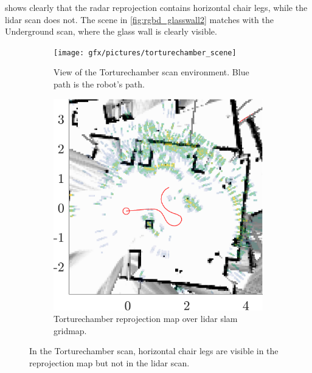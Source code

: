  shows clearly that the radar reprojection contains horizontal chair legs, while the lidar scan does not. The scene in \cref{fig:rgbd_glasswall2} matches with the Underground scan, where the glass wall is clearly visible.

\begin{figure}
    \begin{subfigure}[t]{.485\textwidth}
        \centering
        \texttt{[image: gfx/pictures/torturechamber\_scene]}
        \caption{View of the Torturechamber scan environment. Blue path is the robot's path.}
        \label{fig:chairs_scene}
    \end{subfigure}%
    \hfill%
    \begin{subfigure}[t]{.485\textwidth}
        \centering
        \includegraphics[max width=\textwidth]{gfx/results/torturechamber_map}
        \caption{Torturechamber reprojection map over lidar slam gridmap.}
        \label{fig:chairs_map}
    \end{subfigure}%
    \caption{In the Torturechamber scan, horizontal chair legs are visible in the reprojection map but not in the lidar scan.}
    \label{fig:chairlegs}
\end{figure}

